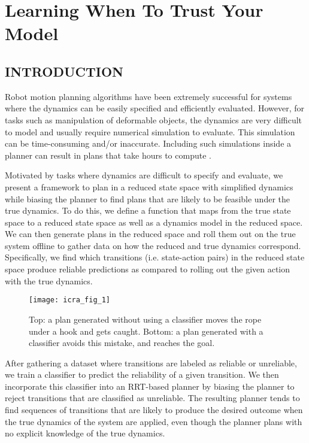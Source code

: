 \chapter{Learning When To Trust Your Model}
\label{chap:learning_when_to_trust}




\section{INTRODUCTION}

Robot motion planning algorithms have been extremely successful for systems where the dynamics can be easily specified and efficiently evaluated. However, for tasks such as manipulation of deformable objects, the dynamics are very difficult to model \cite{Essahbi2012} and usually require numerical simulation to evaluate. This simulation can be time-consuming and/or inaccurate. Including such simulations inside a planner can result in plans that take hours to compute \cite{Bai2016}.

Motivated by tasks where dynamics are difficult to specify and evaluate, we present a framework to plan in a reduced state space with simplified dynamics while biasing the planner to find plans that are likely to be feasible under the true dynamics. To do this, we define a function that maps from the true state space to a reduced state space as well as a dynamics model in the reduced space. We can then generate plans in the reduced space and roll them out on the true system offline to gather data on how the reduced and true dynamics correspond. Specifically, we find which transitions (i.e. state-action pairs) in the reduced state space produce reliable predictions as compared to rolling out the given action with the true dynamics. 

\begin{figure}[t]
    \centering
    \texttt{[image: icra\_fig\_1]}
    \caption{Top: a plan generated without using a classifier moves the rope under a hook and gets caught. Bottom: a plan generated with a classifier avoids this mistake, and reaches the goal.}
    \label{fig:intro_figure}
\end{figure}

After gathering a dataset where transitions are labeled as reliable or unreliable, we train a classifier to predict the reliability of a given transition. We then incorporate this classifier into an RRT-based planner by biasing the planner to reject transitions that are classified as unreliable. The resulting planner tends to find sequences of transitions that are likely to produce the desired outcome when the true dynamics of the system are applied, even though the planner plans with no explicit knowledge of the true dynamics.

